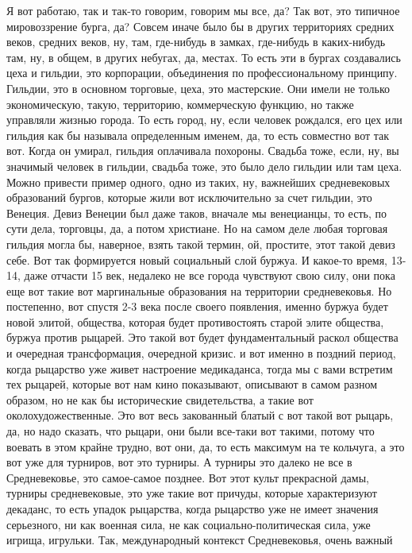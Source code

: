 Я вот работаю, так и так-то говорим, говорим мы все, да? Так вот, это типичное
мировоззрение бурга, да? Совсем иначе было бы в других территориях средних
веков, средних веков, ну, там, где-нибудь в замках, где-нибудь в каких-нибудь
там, ну, в общем, в других небугах, да, местах. То есть эти в бургах создавались
цеха и гильдии, это корпорации, объединения по профессиональному принципу.
Гильдии, это в основном торговые, цеха, это мастерские. Они имели не только
экономическую, такую, территорию, коммерческую функцию, но также управляли
жизнью города. То есть город, ну, если человек рождался, его цех или гильдия как
бы называла определенным именем, да, то есть совместно вот так вот. Когда он
умирал, гильдия оплачивала похороны. Свадьба тоже, если, ну, вы значимый человек
в гильдии, свадьба тоже, это было дело гильдии или там цеха. Можно привести
пример одного, одно из таких, ну, важнейших средневековых образований бургов,
которые жили вот исключительно за счет гильдии, это Венеция. Девиз Венеции был
даже таков, вначале мы венецианцы, то есть, по сути дела, торговцы, да, а потом
христиане. Но на самом деле любая торговая гильдия могла бы, наверное, взять
такой термин, ой, простите, этот такой девиз себе. Вот так формируется новый
социальный слой буржуа. И какое-то время, 13-14, даже отчасти 15 век, недалеко
не все города чувствуют свою силу, они пока еще вот такие вот маргинальные
образования на территории средневековья. Но постепенно, вот спустя 2-3 века
после своего появления, именно буржуа будет новой элитой, общества, которая
будет противостоять старой элите общества, буржуа против рыцарей. Это такой вот
будет фундаментальный раскол общества и очередная трансформация, очередной
кризис. и вот именно в поздний период, когда рыцарство уже живет настроение
медикаданса, тогда мы с вами встретим тех рыцарей, которые вот нам кино
показывают, описывают в самом разном образом, но не как бы исторические
свидетельства, а такие вот околохудожественные. Это вот весь закованный блатый с
вот такой вот рыцарь, да, но надо сказать, что рыцари, они были все-таки вот
такими, потому что воевать в этом крайне трудно, вот они, да, то есть максимум
на те кольчуга, а это вот уже для турниров, вот это турниры. А турниры это
далеко не все в Средневековье, это самое-самое позднее. Вот этот культ
прекрасной дамы, турниры средневековые, это уже такие вот причуды, которые
характеризуют декаданс, то есть упадок рыцарства, когда рыцарство уже не имеет
значения серьезного, ни как военная сила, не как социально-политическая сила,
уже игрища, игрульки. Так, международный контекст Средневековья, очень важный
